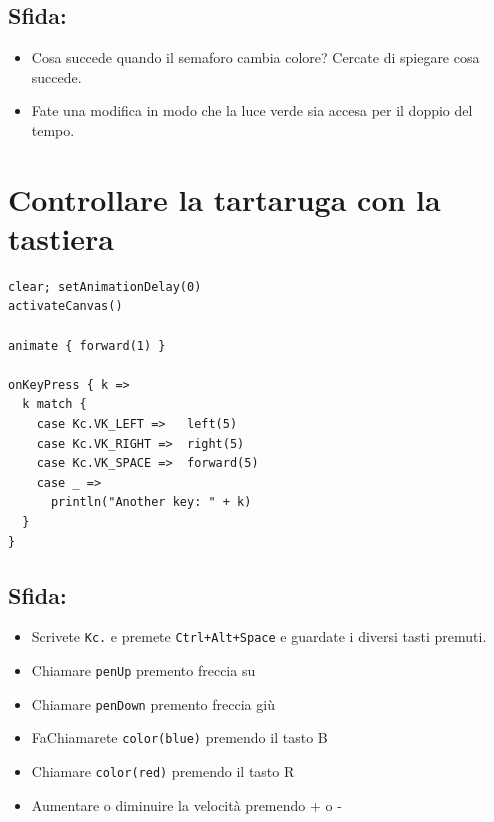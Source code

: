 \section*{\color{BrickRed}Sfida:}


\begin{itemize}

\item {Cosa succede quando il semaforo cambia colore? Cercate di spiegare cosa succede.}
\item {Fate una modifica in modo che la luce verde sia accesa per il doppio del tempo.}

\end{itemize}


\chapter{Controllare la tartaruga con la tastiera}
\begin{multicols}{2}

\begin{lstlisting}[basicstyle={\ttfamily\fontsize{18}{22}\selectfont},numbers=none]
clear; setAnimationDelay(0)
activateCanvas()

animate { forward(1) }

onKeyPress { k =>
  k match {
    case Kc.VK_LEFT =>   left(5)
    case Kc.VK_RIGHT =>  right(5)
    case Kc.VK_SPACE =>  forward(5)
    case _ => 
      println("Another key: " + k)
  }
}
\end{lstlisting}
        


\columnbreak


\section*{\color{BrickRed}Sfida:}


\begin{itemize}

\item {Scrivete \lstinline{Kc.} e premete \lstinline{Ctrl+Alt+Space} e guardate i diversi tasti premuti.}
\item {Chiamare \lstinline{penUp} premento freccia su}
\item {Chiamare \lstinline{penDown} premento freccia giù}
\item {FaChiamarete \lstinline{color(blue)} premendo il tasto B}
\item {Chiamare \lstinline{color(red)} premendo il tasto R}
\item {Aumentare o diminuire la velocità premendo + o -}

\end{itemize}


\end{multicols}

